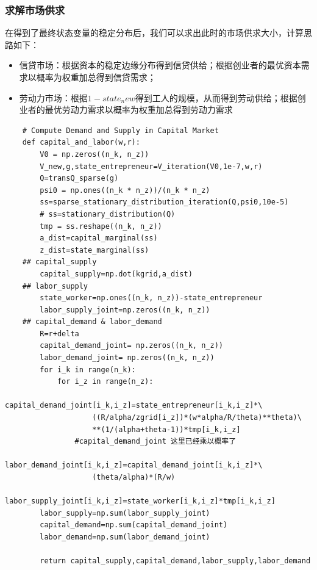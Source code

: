 \documentclass[a4paper, 12pt]{ctexart}
\begin{document}
\subsubsection{求解市场供求}
在得到了最终状态变量的稳定分布后，我们可以求出此时的市场供求大小，计算思路如下：
\begin{itemize}
    \item 信贷市场：根据资本的稳定边缘分布得到信贷供给；根据创业者的最优资本需求以概率为权重加总得到信贷需求；
    \item 劳动力市场：根据$1-state_new$得到工人的规模，从而得到劳动供给；根据创业者的最优劳动力需求以概率为权重加总得到劳动力需求
\end{itemize}
\begin{lstlisting}
    # Compute Demand and Supply in Capital Market
    def capital_and_labor(w,r):
        V0 = np.zeros((n_k, n_z))
        V_new,g,state_entrepreneur=V_iteration(V0,1e-7,w,r)
        Q=transQ_sparse(g)
        psi0 = np.ones((n_k * n_z))/(n_k * n_z)
        ss=sparse_stationary_distribution_iteration(Q,psi0,10e-5)
        # ss=stationary_distribution(Q)
        tmp = ss.reshape((n_k, n_z))
        a_dist=capital_marginal(ss)
        z_dist=state_marginal(ss)
    ## capital_supply
        capital_supply=np.dot(kgrid,a_dist)
    ## labor_supply
        state_worker=np.ones((n_k, n_z))-state_entrepreneur
        labor_supply_joint=np.zeros((n_k, n_z))            
    ## capital_demand & labor_demand
        R=r+delta
        capital_demand_joint= np.zeros((n_k, n_z))
        labor_demand_joint= np.zeros((n_k, n_z))
        for i_k in range(n_k):
            for i_z in range(n_z):
                capital_demand_joint[i_k,i_z]=state_entrepreneur[i_k,i_z]*\
                    ((R/alpha/zgrid[i_z])*(w*alpha/R/theta)**theta)\
                    **(1/(alpha+theta-1))*tmp[i_k,i_z] 
                #capital_demand_joint 这里已经乘以概率了
                labor_demand_joint[i_k,i_z]=capital_demand_joint[i_k,i_z]*\
                    (theta/alpha)*(R/w)
                labor_supply_joint[i_k,i_z]=state_worker[i_k,i_z]*tmp[i_k,i_z]
        labor_supply=np.sum(labor_supply_joint)
        capital_demand=np.sum(capital_demand_joint)
        labor_demand=np.sum(labor_demand_joint)
        
        return capital_supply,capital_demand,labor_supply,labor_demand
\end{lstlisting}
\end{document}
